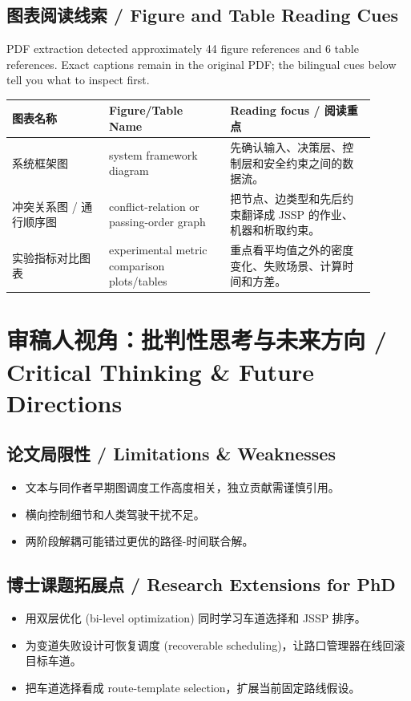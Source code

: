 \documentclass[UTF8,a4paper,11pt,fontset=fandol]{ctexart}
\begin{document}
\subsection{图表阅读线索 / Figure and Table Reading Cues}
PDF extraction detected approximately 44 figure references and 6 table references. Exact captions remain in the original PDF; the bilingual cues below tell you what to inspect first.

\begin{longtable}{p{0.24\linewidth}p{0.30\linewidth}p{0.36\linewidth}}
\toprule
图表名称 & Figure/Table Name & Reading focus / 阅读重点\\
\midrule
系统框架图 & system framework diagram & 先确认输入、决策层、控制层和安全约束之间的数据流。 \\
冲突关系图 / 通行顺序图 & conflict-relation or passing-order graph & 把节点、边类型和先后约束翻译成 JSSP 的作业、机器和析取约束。 \\
实验指标对比图表 & experimental metric comparison plots/tables & 重点看平均值之外的密度变化、失败场景、计算时间和方差。 \\
\bottomrule
\end{longtable}

\section{审稿人视角：批判性思考与未来方向 / Critical Thinking \& Future Directions}
\subsection{论文局限性 / Limitations \& Weaknesses}
\begin{itemize}
\item 文本与同作者早期图调度工作高度相关，独立贡献需谨慎引用。
\item 横向控制细节和人类驾驶干扰不足。
\item 两阶段解耦可能错过更优的路径-时间联合解。
\end{itemize}


\subsection{博士课题拓展点 / Research Extensions for PhD}
\begin{itemize}
\item 用双层优化 (bi-level optimization) 同时学习车道选择和 JSSP 排序。
\item 为变道失败设计可恢复调度 (recoverable scheduling)，让路口管理器在线回滚目标车道。
\item 把车道选择看成 route-template selection，扩展当前固定路线假设。
\end{itemize}
\end{document}
